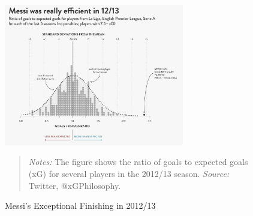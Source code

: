 \begin{figure}[ht!]
    \centering
    \includegraphics[width=0.7\textwidth]{graphics/messi_2012.jpg}
    \caption{Messi's Exceptional Finishing in 2012/13}
    \label{fig:messi_goals_xg_2012}
    \begin{quote}
        \textit{Notes:} 
        The figure shows the ratio of goals to expected goals (xG) for several 
        players in the 2012/13 season.
        \textit{Source:} Twitter, @xGPhilosophy.
    \end{quote} 
\end{figure}
